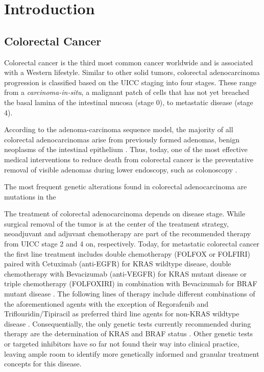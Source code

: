 \chapter{Introduction}
\label{introduction}

\begin{flushleft}
\setlength{\parindent}{7ex}
\section{Colorectal Cancer}
Colorectal cancer is the third most common cancer worldwide and is associated with a Western lifestyle. Similar to other solid tumors, colorectal adenocarcinoma progression is classified based on the UICC staging into four stages. These range from a \textit{carcinoma-in-situ}, a malignant patch of cells that has not yet breached the basal lamina of the intestinal mucosa (stage 0), to metastatic disease (stage 4).\par

According to the adenoma-carcinoma sequence model, the majority of all colorectal adenocarcinomas arise from previously formed adenomas, benign neoplasms of the intestinal epithelium \cite{Cho1992}. Thus, today, one of the most effective medical interventions to reduce death from colorectal cancer is the preventative removal of visible adenomas during lower endoscopy, such as colonoscopy \cite{Nishihara2013Long-TermEndoscopy}.\par

The most frequent genetic alterations found in colorectal adenocarcinoma are mutations in the \par

The treatment of colorectal adenocarcinoma depends on disease stage. While surgical removal of the tumor is at the center of the treatment strategy, neoadjuvant and adjuvant chemotherapy are part of the recommended therapy from UICC stage 2 and 4 on, respectively. Today, for metastatic colorectal cancer the first line treatment includes double chemotherapy (FOLFOX or FOLFIRI) paired with Cetuximab (anti-EGFR) for KRAS wildtype disease, double chemotherapy with Bevacizumab (anti-VEGFR) for KRAS mutant disease or triple chemotherapy (FOLFOXIRI) in combination with Bevacizumab for BRAF mutant disease \cite{Cutsem}. The following lines of therapy include different combinations of the aforementioned agents with the exception of Regorafenib and Triflouridin/Tipiracil as preferred third line agents for non-KRAS wildtype disease \cite{Cutsem}. Consequentially, the only genetic tests currently recommended during therapy are the determination of KRAS and BRAF status \cite{Cutsem}. Other genetic tests or targeted inhibitors have so far not found their way into clinical practice, leaving ample room to identify more genetically informed and granular treatment concepts for this disease.\par


\end{flushleft}
